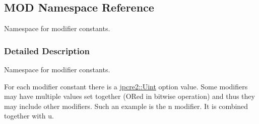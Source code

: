 \hypertarget{namespaceMOD}{}\subsection{M\+OD Namespace Reference}
\label{namespaceMOD}


Namespace for modifier constants.  




\subsubsection{Detailed Description}
Namespace for modifier constants. 

For each modifier constant there is a \hyperlink{namespacejpcre2_a078242d38221a13fb3543b9edd78c099}{jpcre2\+::\+Uint} option value. Some modifiers may have multiple values set together (O\+Red in bitwise operation) and thus they may include other modifiers. Such an example is the \textquotesingle{}n\textquotesingle{} modifier. It is combined together with \textquotesingle{}u\textquotesingle{}. 